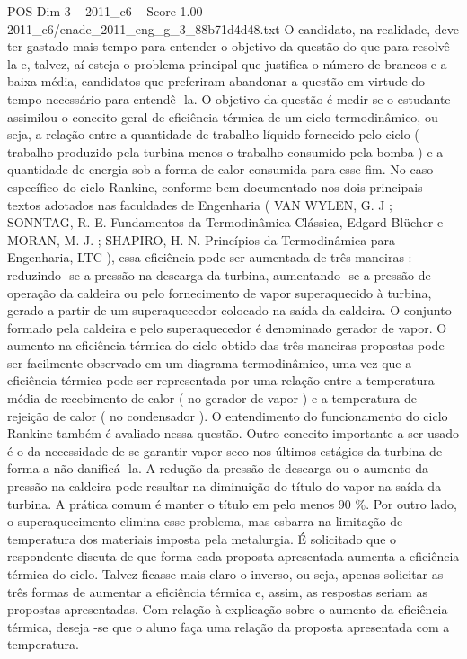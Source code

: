 \begin{textsample}{POS Dim 3 – 2011\_c6 – Score 1.00 – 2011\_c6/enade\_2011\_eng\_g\_3\_88b71d4d48.txt}
O candidato, na realidade, deve ter gastado mais tempo para entender o objetivo da questão do que para resolvê -la e, talvez, aí esteja o problema principal que justifica o número de brancos e a baixa média, candidatos que preferiram abandonar a questão em virtude do tempo necessário para entendê -la.
O objetivo da questão é medir se o estudante assimilou o conceito geral de eficiência térmica de um ciclo termodinâmico, ou seja, a relação entre a quantidade de trabalho líquido fornecido pelo ciclo ( trabalho produzido pela turbina menos o trabalho consumido pela bomba ) e a quantidade de energia sob a forma de calor consumida para esse fim.
No caso específico do ciclo Rankine, conforme bem documentado nos dois principais textos adotados nas faculdades de Engenharia ( VAN WYLEN, G.
J ; SONNTAG, R.
E.
Fundamentos da Termodinâmica Clássica, Edgard Blücher e MORAN, M.
J. ; SHAPIRO, H.
N.
Princípios da Termodinâmica para Engenharia, LTC ), essa eficiência pode ser aumentada de três maneiras : reduzindo -se a pressão na descarga da turbina, aumentando -se a pressão de operação da caldeira ou pelo fornecimento de vapor superaquecido à turbina, gerado a partir de um superaquecedor colocado na saída da caldeira.
O conjunto formado pela caldeira e pelo superaquecedor é denominado gerador de vapor.
O aumento na eficiência térmica do ciclo obtido das três maneiras propostas pode ser facilmente observado em um diagrama termodinâmico, uma vez que a eficiência térmica pode ser representada por uma relação entre a temperatura média de recebimento de calor ( no gerador de vapor ) e a temperatura de rejeição de calor ( no condensador ).
O entendimento do funcionamento do ciclo Rankine também é avaliado nessa questão.
Outro conceito importante a ser usado é o da necessidade de se garantir vapor seco nos últimos estágios da turbina de forma a não danificá -la.
A redução da pressão de descarga ou o aumento da pressão na caldeira pode resultar na diminuição do título do vapor na saída da turbina.
A prática comum é manter o título em pelo menos 90 \%.
Por outro lado, o superaquecimento elimina esse problema, mas esbarra na limitação de temperatura dos materiais imposta pela metalurgia.
É solicitado que o respondente discuta de que forma cada proposta apresentada aumenta a eficiência térmica do ciclo.
Talvez ficasse mais claro o inverso, ou seja, apenas solicitar as três formas de aumentar a eficiência térmica e, assim, as respostas seriam as propostas apresentadas.
Com relação à explicação sobre o aumento da eficiência térmica, deseja -se que o aluno faça uma relação da proposta apresentada com a temperatura.

\end{textsample}
